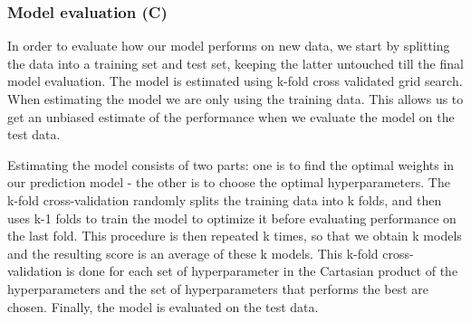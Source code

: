 \subsubsection{Model evaluation (C)}
In order to evaluate how our model performs on new data, we start by splitting the data into a training set and test set, keeping the latter untouched till the final model evaluation. The model is estimated using k-fold cross validated grid search. When estimating the model we are only using the training data. This allows us to get an unbiased estimate of the performance when we evaluate the model on  the test data.
\par
Estimating the model consists of two parts: one is to find the optimal weights in our prediction model - the other is to choose the optimal hyperparameters. The k-fold cross-validation randomly splits the training data into k folds, and then uses k-1 folds to train the model to optimize it before evaluating performance on the last fold. This procedure is then repeated k times, so that we obtain k models and the resulting score is an average of these k models. This k-fold cross-validation is done for each set of hyperparameter in the Cartasian product of the hyperparameters and the set of hyperparameters that performs the best are chosen. Finally, the model is evaluated on the test data.
